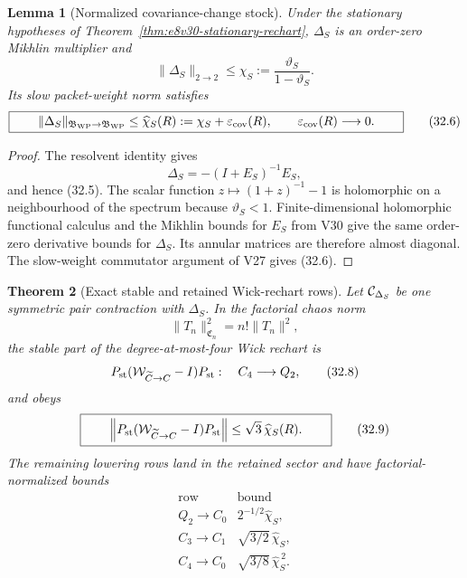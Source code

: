 \documentclass[11pt,oneside]{book}
\newtheorem{theorem}{Theorem}[chapter]
\newtheorem{lemma}[theorem]{Lemma}
\theoremstyle{definition}
\theoremstyle{remark}
\begin{document}
\begin{lemma}[Normalized covariance-change stock]
\label{lem:e8v32-covariance-stock}
Under the stationary hypotheses of
Theorem~\ref{thm:e8v30-stationary-rechart},
\(\Delta_S\) is an order-zero Mikhlin multiplier and
\[
 \|\Delta_S\|_{2\to2}
 \leq\chi_S:=\frac{\vartheta_S}{1-\vartheta_S}.                   \tag{32.5}
\]
Its slow packet-weight norm satisfies
\[
\boxed{\qquad
 \|\Delta_S\|_{\mathfrak B_{\rm WP}\to\mathfrak B_{\rm WP}}
 \leq\widehat\chi_S(R):=
 \chi_S+\varepsilon_{\rm cov}(R),\qquad
 \varepsilon_{\rm cov}(R)\longrightarrow0.
\qquad}                                                           \tag{32.6}
\]
\end{lemma}

\begin{proof}
The resolvent identity gives
\[
 \Delta_S=-(I+E_S)^{-1}E_S,
\]
and hence (32.5).  The scalar function
\(z\mapsto(1+z)^{-1}-1\) is holomorphic on a neighbourhood of the
spectrum because \(\vartheta_S<1\).  Finite-dimensional holomorphic
functional calculus and the Mikhlin bounds for \(E_S\) from V30 give
the same order-zero derivative bounds for \(\Delta_S\).  Its annular
matrices are therefore almost diagonal.  The slow-weight commutator
argument of V27 gives (32.6).
\end{proof}

\begin{theorem}[Exact stable and retained Wick-rechart rows]
\label{thm:e8v32-Wick-rows}
Let \({\cal C}_{\Delta_S}\) be one symmetric pair contraction with
\(\Delta_S\).  In the factorial chaos norm
\[
                       \|T_n\|_{\mathfrak C_n}^2=n!\|T_n\|^2,     \tag{32.7}
\]
the stable part of the degree-at-most-four Wick rechart is
\[
 P_{\rm st}({\cal W}_{\widetilde C\to C}-I)P_{\rm st}:
 \quad C_4\longrightarrow Q_2,                                  \tag{32.8}
\]
and obeys
\[
\boxed{\qquad
 \left\|
 P_{\rm st}({\cal W}_{\widetilde C\to C}-I)P_{\rm st}
 \right\|
 \leq\sqrt3\,\widehat\chi_S(R).
\qquad}                                                           \tag{32.9}
\]
The remaining lowering rows land in the retained sector and have
factorial-normalized bounds
\[
\begin{array}{c|c}
\text{row}&\text{bound}\\ \hline
Q_2\to C_0&2^{-1/2}\widehat\chi_S,\\
C_3\to C_1&\sqrt{3/2}\,\widehat\chi_S,\\
C_4\to C_0&\sqrt{3/8}\,\widehat\chi_S^{\,2}.
\end{array}                                                       \tag{32.10}
\]
\end{theorem}
\end{document}
